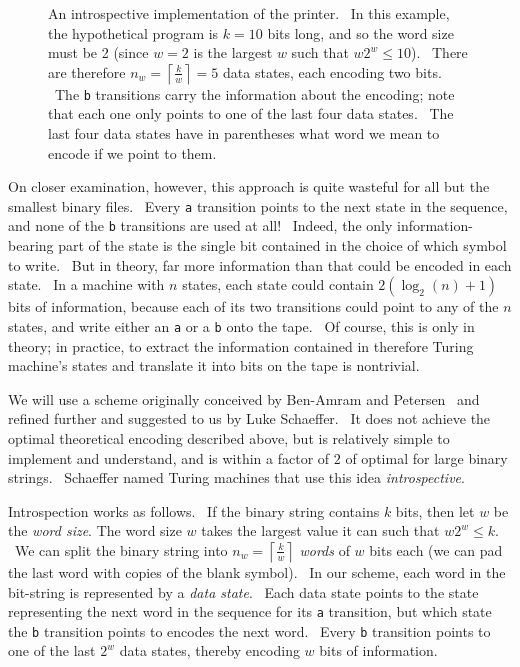 \documentclass[11pt]{article}
\begin{document}
\begin{figure}
\begin{center}
\caption{An introspective implementation of the printer. \ In this example, the hypothetical program is $k=10$ bits long, and so the word size must be 2 (since $w=2$ is the largest $w$ such that $w2^w \le 10$). \ There are therefore $n_w = \left \lceil{\frac{k}{w}}\right \rceil = 5$ data states, each encoding two bits. \ The \texttt{b} transitions carry the information about the encoding; note that each one only points to one of the last four data states. \ The last four data states have in parentheses what word we mean to encode if we point to them. \label{fig:introspectprog}}
\end{center}
\end{figure}

On closer examination, however, this approach is quite wasteful for all but the smallest binary files. \ Every \texttt{a} transition points to the next state in the sequence, and none of the \texttt{b} transitions are used at all! \ Indeed, the only information-bearing part of the state is the single bit contained in the choice of which symbol to write. \ But in theory, far more information than that could be encoded in each state. \ In a machine with $n$ states, each state could contain $2(\log_2(n) + 1)$ bits of information, because each of its two transitions could point to any of the $n$ states, and write either an \texttt{a} or a \texttt{b} onto the tape. \ Of course, this is only in theory; in practice, to extract the information contained in therefore Turing machine's states and translate it into bits on the tape is nontrivial.

We will use a scheme originally conceived by Ben-Amram and Petersen~\cite{benamram} and refined further and suggested to us by Luke Schaeffer. \ It does not achieve the optimal theoretical encoding described above, but is relatively simple to implement and understand, and is within a factor of $2$ of optimal for large binary strings. \ Schaeffer named Turing machines that use this idea \emph{introspective}.

Introspection works as follows. \ If the binary string contains $k$ bits, then let $w$ be the \emph{word size}. The word size $w$ takes the largest value it can such that $w2^w \le k$. \ We can split the binary string into $n_w = \left \lceil{\frac{k}{w}}\right \rceil$ \emph{words} of $w$ bits each (we can pad the last word with copies of the blank symbol). \ In our scheme, each word in the bit-string is represented by a \emph{data state}. \ Each data state points to the state representing the next word in the sequence for its \texttt{a} transition, but which state the \texttt{b} transition points to encodes the next word. \ Every \texttt{b} transition points to one of the last $2^w$ data states, thereby encoding $w$ bits of information.
\end{document}

